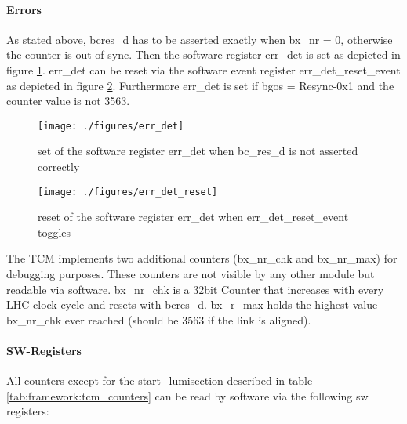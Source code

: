 \paragraph{Errors}\label{subsec:framework:tcmerrors}
As stated above, bcres\_d has to be asserted exactly when bx\_nr = 0, otherwise the counter is out of sync. Then the software register err\_det is set as depicted in figure \ref{fig:err_det}. err\_det can be reset via the software event register err\_det\_reset\_event as depicted in figure \ref{fig:err_det_reset}. Furthermore err\_det is set if bgos = Resync-0x1 and the counter value is not 3563.

\begin{figure}[ht]
  \texttt{[image: ./figures/err\_det]}
  \caption{set of the software register err\_det when bc\_res\_d is not asserted correctly}
  \label{fig:err_det}
\end{figure}

\begin{figure}[ht]
  \texttt{[image: ./figures/err\_det\_reset]}
  \caption{reset of the software register err\_det when err\_det\_reset\_event toggles}
  \label{fig:err_det_reset}
\end{figure}

The TCM implements two additional counters (bx\_nr\_chk and bx\_nr\_max) for debugging purposes. These counters are not visible by any other module but readable via software. bx\_nr\_chk is a 32bit Counter that increases with every LHC clock cycle and resets with bcres\_d. bx\_r\_max holds the highest value bx\_nr\_chk ever reached (should be 3563 if the link is aligned).

\paragraph{SW-Registers}
All counters except for the start\_lumisection described in table \ref{tab:framework:tcm_counters} can be read by software via the following sw registers:

